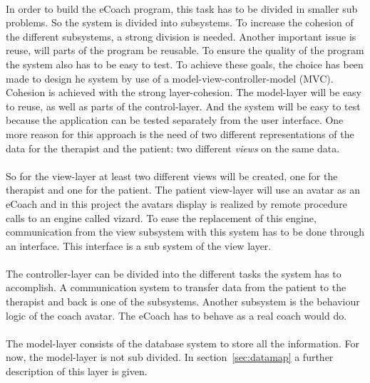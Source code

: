 
\paragraph{}
In order to build the eCoach program, this task has to be divided in smaller sub problems. So the system is divided into subsystems. To increase the cohesion of the different subsystems, a strong division is needed. Another important issue is reuse, will parts of the program be reusable. To ensure the quality of the program the system also has to be easy to test. To achieve these goals, the choice has been made to design he system by use of a \gls{model-view-controller}-model (MVC). Cohesion is achieved  with the strong layer-cohesion. The model-layer will be easy to reuse, as well as parts of the control-layer. And the system will be easy to test because the application can be tested separately from the user interface. One more reason for this approach is the need of two different representations of the data for the therapist and the patient: two different \textit{views} on the same data.
\paragraph{}
So for the view-layer at least two different views will be created, one for the therapist and one for the patient. The patient view-layer will  use an avatar as an eCoach and in this project the avatars display is realized by remote procedure calls to an engine called vizard. To ease the replacement of this engine, communication from the view subsystem with this system has to be done through an interface. This interface is a sub system of the view layer.
\paragraph{}
The controller-layer can be divided into the different tasks the system has to accomplish. A communication system to transfer data from the patient to the therapist and back is one of the subsystems. Another subsystem is the behaviour logic of the coach avatar. The eCoach has to behave as a real coach would do. 
\paragraph{}
The model-layer consists of the database system to store all the information. For now, the model-layer is not sub divided. In section~\ref{sec:datamap} a further description of this layer is given.
